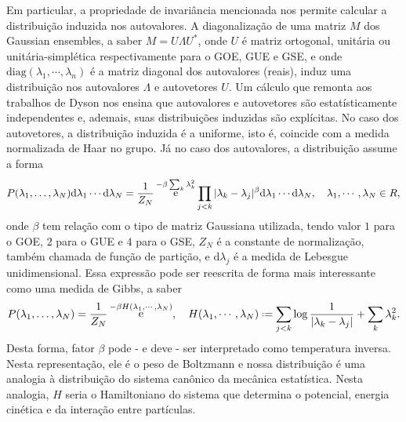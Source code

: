\documentclass[12pt]{report}
\DeclareMathOperator{\ee}{\rm e}
\newcommand{\dd}{\mathrm{d}}
\newcommand*{\deff}{\mathrel{\vcenter{\baselineskip0.5ex \lineskiplimit0pt
			\hbox{\scriptsize.}\hbox{\scriptsize.}}}%
	=}
\begin{document}
Em particular, a propriedade de invariância mencionada nos permite calcular a distribuição induzida nos autovalores. A diagonalização de uma matriz $M$ dos Gaussian ensembles, a saber $M=U\Lambda U^*$, onde $U$ é matriz ortogonal, unitária ou unitária-simplética respectivamente para o GOE, GUE e GSE, e onde $\mathrm{diag}(\lambda_1,\cdots,\lambda_n)$ é a matriz diagonal dos autovalores (reais), induz uma distribuição nos autovalores $\Lambda$ e autovetores $U$. Um cálculo que remonta aos trabalhos de Dyson nos ensina que autovalores e autovetores são estatísticamente independentes e, ademais, suas distribuições induzidas são explícitas. No caso dos autovetores, a distribuição induzida é a uniforme, isto é, coincide com a medida normalizada de Haar no grupo. Já no caso dos autovalores, a distribuição assume a forma
%
%
\begin{equation*}
	P(\lambda_1, \ldots, \lambda_N) \dd\lambda_1\cdots \dd\lambda_N= \frac{1}{Z_N} \ee^{-\beta \sum_{k}\lambda_k^2}\prod_{j<k}|\lambda_k - \lambda_j|^\beta \dd\lambda_1\cdots \dd\lambda_N , \quad \lambda_1,\cdots, \lambda_N\in R,
\end{equation*}
%
onde $\beta$ tem relação com o tipo de matriz Gaussiana utilizada, tendo valor $1$ para o GOE, $2$ para o GUE e $4$ para o GSE, $Z_N$ é a constante de normalização, também chamada de função de partição, e $\dd\lambda_j$ é a medida de Lebesgue unidimensional. Essa expressão pode ser reescrita de forma mais interessante como uma medida de Gibbs, a saber
%
\begin{equation}\label{eigdist1}
	P(\lambda_1, \ldots, \lambda_N)  = \frac{1}{Z_N} \ee^{-\beta H(\lambda_1,\cdots,\lambda_N)},\quad H(\lambda_1,\cdots,\lambda_N)\deff \sum_{j<k}\log\frac{1}{|\lambda_k - \lambda_j|}+\sum_{k}\lambda_k^2.
\end{equation}
%
Desta forma, fator $\beta$ pode - e deve - ser interpretado como temperatura inversa. Nesta representação, ele é o peso de Boltzmann e nossa distribuição é uma analogia à distribuição do sistema canônico da mecânica estatística. Nesta analogia, $H$ seria o Hamiltoniano do sistema que determina o potencial, energia cinética e da interação entre partículas.
\end{document}
